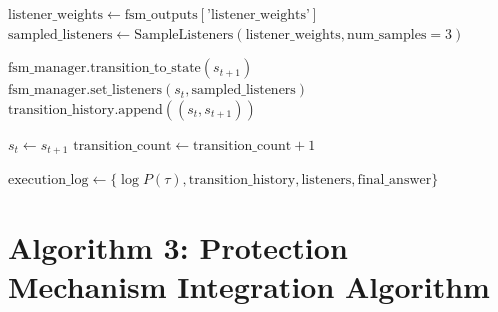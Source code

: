 \documentclass[11pt,a4paper]{article}
\begin{document}
\begin{algorithm}[H]
{    
    
    $\text{listener\_weights} \leftarrow \text{fsm\_outputs}[\text{'listener\_weights'}]$ 
    $\text{sampled\_listeners} \leftarrow \text{SampleListeners}(\text{listener\_weights}, \text{num\_samples}=3)$ 
    
    
    $\text{fsm\_manager}.\text{transition\_to\_state}(s_{t+1})$\;
    $\text{fsm\_manager}.\text{set\_listeners}(s_t, \text{sampled\_listeners})$\;
    $\text{transition\_history}.\text{append}((s_t, s_{t+1}))$\;
    
    $s_t \leftarrow s_{t+1}$\;
    $\text{transition\_count} \leftarrow \text{transition\_count} + 1$\;
}

$\text{execution\_log} \leftarrow \{\log P(\tau), \text{transition\_history}, \text{listeners}, \text{final\_answer}\}$\;

\end{algorithm}

\newpage

\section*{Algorithm 3: Protection Mechanism Integration Algorithm}
\end{document}
